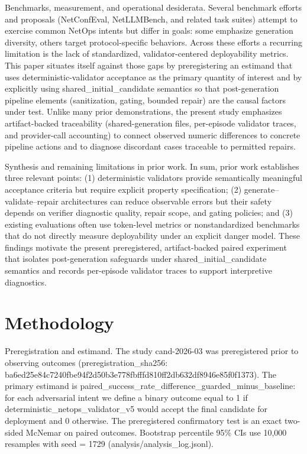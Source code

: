 \documentclass[conference]{IEEEtran}
\begin{document}
Benchmarks, measurement, and operational desiderata. Several benchmark efforts and proposals (NetConfEval, NetLLMBench, and related task suites) attempt to exercise common NetOps intents but differ in goals: some emphasize generation diversity, others target protocol-specific behaviors. Across these efforts a recurring limitation is the lack of standardized, validator-centered deployability metrics. This paper situates itself against those gaps by preregistering an estimand that uses deterministic-validator acceptance as the primary quantity of interest and by explicitly using shared\_initial\_candidate semantics so that post-generation pipeline elements (sanitization, gating, bounded repair) are the causal factors under test. Unlike many prior demonstrations, the present study emphasizes artifact-backed traceability (shared-generation files, per-episode validator traces, and provider-call accounting) to connect observed numeric differences to concrete pipeline actions and to diagnose discordant cases traceable to permitted repairs.

Synthesis and remaining limitations in prior work. In sum, prior work establishes three relevant points: (1) deterministic validators provide semantically meaningful acceptance criteria but require explicit property specification; (2) generate--validate--repair architectures can reduce observable errors but their safety depends on verifier diagnostic quality, repair scope, and gating policies; and (3) existing evaluations often use token-level metrics or nonstandardized benchmarks that do not directly measure deployability under an explicit danger model. These findings motivate the present preregistered, artifact-backed paired experiment that isolates post-generation safeguards under shared\_initial\_candidate semantics and records per-episode validator traces to support interpretive diagnostics.

\section{Methodology}
Preregistration and estimand. The study cand-2026-03 was preregistered prior to observing outcomes (preregistration\_sha256: ba6ed25e\allowbreak{}84c7240f\allowbreak{}be94f2d5\allowbreak{}0b3e778f\allowbreak{}bfffd810\allowbreak{}ff2db632\allowbreak{}df8946e8\allowbreak{}5f0f1373). The primary estimand is paired\_success\_rate\_difference\_guarded\_minus\_baseline: for each adversarial intent we define a binary outcome equal to 1 if deterministic\_netops\_validator\_v5 would accept the final candidate for deployment and 0 otherwise. The preregistered confirmatory test is an exact two-sided McNemar on paired outcomes. Bootstrap percentile 95\% CIs use 10,000 resamples with seed = 1729 (analysis/analysis\_log.jsonl).
\end{document}
